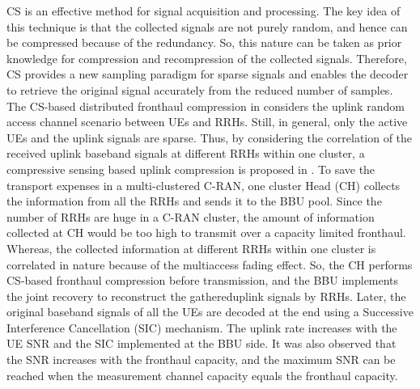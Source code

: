 \begin{multicols}{2}
\begin{itemize}
CS is an effective method for signal acquisition and processing. The key idea of this technique is that the collected signals are not purely random, and hence can be compressed because of the redundancy. So, this nature can be taken as prior knowledge for compression and recompression of the collected signals. Therefore, CS provides a new sampling paradigm for sparse signals and enables the decoder to retrieve the original signal accurately from the reduced number of samples. The CS-based distributed fronthaul compression in \cite{art3-key54} considers the uplink random access channel scenario between UEs and RRHs. Still, in general, only the active UEs and the uplink signals are sparse. Thus, by considering the correlation of the received uplink baseband signals at different RRHs within one cluster, a compressive sensing based uplink compression is proposed in \cite{art3-key55}. To save the transport expenses in a multi-clustered C-RAN, one cluster Head (CH) collects the information from all the RRHs and sends it to the BBU pool. Since the number of RRHs are huge in a C-RAN cluster, the amount of information collected at CH would be too high to transmit over a capacity limited fronthaul. Whereas, the collected information at different RRHs within one cluster is correlated in nature because of the multiaccess fading effect. So, the CH performs CS-based fronthaul compression before transmission, and the BBU implements the joint recovery to reconstruct the gathered\break uplink signals by RRHs. Later, the original baseband signals of all the UEs are decoded at the end using a Successive Interference Cancellation (SIC) mechanism. The uplink rate increases with the UE SNR and the SIC implemented at the BBU side. It was also observed that the SNR increases with the fronthaul capacity, and the maximum SNR can be reached when the measurement channel capacity equals the fronthaul capacity. 


\end{itemize}
\end{multicols}
